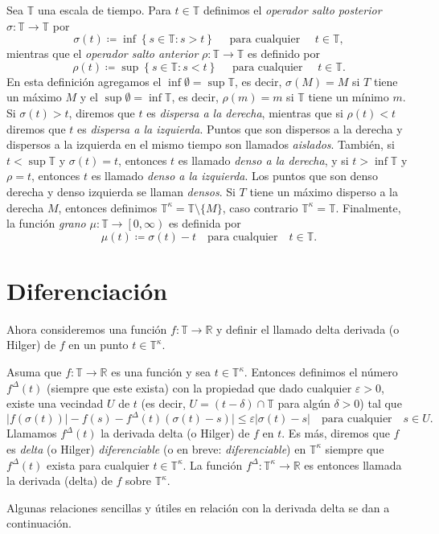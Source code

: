 \begin{definition}
Sea $\mathds{T}$ una escala de tiempo. Para $t\in\mathds{T}$ definimos el \emph{operador salto posterior} $\sigma\colon\mathds{T}\rightarrow\mathds{T}$ por \[ \sigma(t)\coloneqq\inf\left\{s\in\mathds{T}:s>t\right\}\quad\text{ para cualquier }\quad t\in\mathds{T}, \] mientras que el \emph{operador salto anterior} $\rho\colon\mathds{T}\rightarrow\mathds{T}$ es definido por \[ \rho(t)\coloneqq\sup\left\{s\in\mathds{T}:s<t\right\}\quad\text{ para cualquier }\quad t\in\mathds{T}. \] En esta definición agregamos el $\inf\emptyset=\sup\mathds{T}$, es decir, $\sigma(M)=M$ si $T$ tiene un máximo $M$ y el $\sup\emptyset=\inf\mathds{T}$, es decir, $\rho(m)=m$ si $\mathds{T}$ tiene un mínimo $m$. Si $\sigma(t)>t$, diremos que $t$ es \emph{dispersa a la derecha}, mientras que si $\rho(t)<t$ diremos que $t$ es \emph{dispersa a la izquierda}. Puntos que son dispersos a la derecha y dispersos a la izquierda en el mismo tiempo son llamados \emph{aislados}. También, si $t<\sup\mathds{T}$ y $\sigma(t)=t$, entonces $t$ es llamado \emph{denso a la derecha}, y si $t>\inf\mathds{T}$ y $\rho=t$, entonces $t$ es llamado \emph{denso a la izquierda}. Los puntos que son denso derecha y denso izquierda se llaman \emph{densos}. Si $T$ tiene un máximo disperso a la derecha $M$, entonces definimos $\mathds{T}^{\kappa}=\mathds{T}\setminus\{M\}$, caso contrario $\mathds{T}^{\kappa}=\mathds{T}$. Finalmente, la función \emph{grano} $\mu\colon\mathds{T}\rightarrow\left[0,\infty\right)$ es definida por \[ \mu(t)\coloneqq\sigma(t)-t\quad\text{para cualquier}\quad t\in\mathds{T}. \]
\end{definition}

\section{Diferenciación}

Ahora consideremos una función $f\colon\mathds{T}\rightarrow\mathds{R}$ y definir el llamado delta derivada (o Hilger) de $f$ en un punto $t\in\mathds{T}^{\kappa}$.

\begin{definition}
	Asuma que $f\colon\mathds{T}\rightarrow\mathds{R}$ es una función y sea $t\in\mathds{T}^{\kappa}$. Entonces definimos el número $f^{\Delta}(t)$  (siempre que este exista) con la propiedad que dado cualquier $\varepsilon>0$, existe una vecindad $U$ de $t$ (es decir, $U=\left(t-\delta\right)\cap\mathds{T}$ para algún $\delta>0$) tal que \[ |f(\sigma(t))|-f(s)-f^{\Delta}(t)(\sigma(t)-s)|\leq\varepsilon|\sigma(t)-s|\quad\text{para cualquier}\quad s\in U. \] Llamamos $f^{\Delta}(t)$ la derivada delta (o Hilger) de $f$ en $t$. Es más, diremos que $f$ es \emph{delta} (o Hilger) \emph{diferenciable} (o en breve: \emph{diferenciable}) en $\mathds{T}^{\kappa}$ siempre que $f^{\Delta}(t)$ exista para cualquier $t\in\mathds{T}^{\kappa}$. La función $f^{\Delta}\colon\mathds{T}^{\kappa}\rightarrow\mathds{R}$ es entonces llamada la derivada (delta) de $f$ sobre $\mathds{T}^{\kappa}$.

	Algunas relaciones sencillas y útiles en relación con la derivada delta se dan a continuación.
\end{definition}

